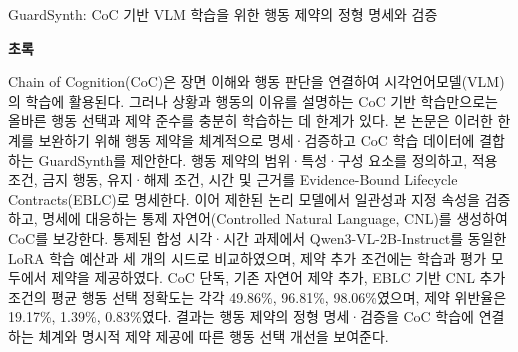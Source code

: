 \documentclass[11pt,a4paper]{article}
\begin{document}
\vspace*{8mm}
{\Large\bfseries\color{navy}\raggedright GuardSynth: CoC 기반 VLM 학습을 위한 행동 제약의 정형 명세와 검증\par}
\vspace{8mm}
{\large\bfseries 초록\par}
\vspace{3mm}
Chain of Cognition(CoC)은 장면 이해와 행동 판단을 연결하여 시각언어모델(VLM)의 학습에 활용된다. 그러나 상황과 행동의 이유를 설명하는 CoC 기반 학습만으로는 올바른 행동 선택과 제약 준수를 충분히 학습하는 데 한계가 있다. 본 논문은 이러한 한계를 보완하기 위해 행동 제약을 체계적으로 명세·검증하고 CoC 학습 데이터에 결합하는 GuardSynth를 제안한다. 행동 제약의 범위·특성·구성 요소를 정의하고, 적용 조건, 금지 행동, 유지·해제 조건, 시간 및 근거를 Evidence-Bound Lifecycle Contracts(EBLC)로 명세한다. 이어 제한된 논리 모델에서 일관성과 지정 속성을 검증하고, 명세에 대응하는 통제 자연어(Controlled Natural Language, CNL)를 생성하여 CoC를 보강한다. 통제된 합성 시각·시간 과제에서 Qwen3-VL-2B-Instruct를 동일한 LoRA 학습 예산과 세 개의 시드로 비교하였으며, 제약 추가 조건에는 학습과 평가 모두에서 제약을 제공하였다. CoC 단독, 기존 자연어 제약 추가, EBLC 기반 CNL 추가 조건의 평균 행동 선택 정확도는 각각 49.86\%, 96.81\%, 98.06\%였으며, 제약 위반율은 19.17\%, 1.39\%, 0.83\%였다. 결과는 행동 제약의 정형 명세·검증을 CoC 학습에 연결하는 체계와 명시적 제약 제공에 따른 행동 선택 개선을 보여준다.
\end{document}

